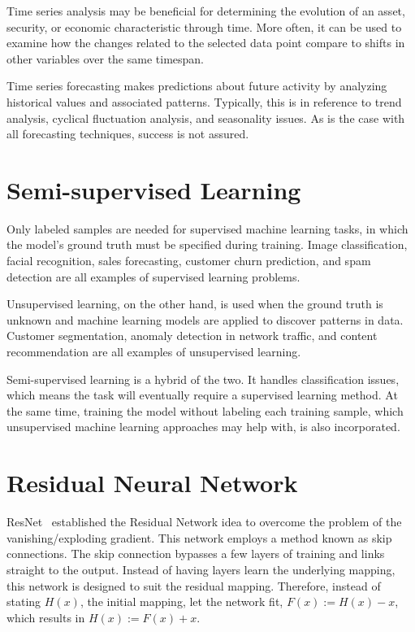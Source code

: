 Time series analysis may be beneficial for determining the evolution of an asset, security, or economic characteristic through time. More often, it can be used to examine how the changes related to the selected data point compare to shifts in other variables over the same timespan. 

Time series forecasting makes predictions about future activity by analyzing historical values and associated patterns. Typically, this is in reference to trend analysis, cyclical fluctuation analysis, and seasonality issues. As is the case with all forecasting techniques, success is not assured. 


\section{Semi-supervised Learning}

Only labeled samples are needed for supervised machine learning tasks, in which the model's ground truth must be specified during training.
Image classification, facial recognition, sales forecasting, customer churn prediction, and spam detection are all examples of supervised learning problems. 

Unsupervised learning, on the other hand, is used when the ground truth is unknown and machine learning models are applied to discover patterns in data. Customer segmentation, anomaly detection in network traffic, and content recommendation are all examples of unsupervised learning. 

Semi-supervised learning is a hybrid of the two. It handles classification issues, which means the task will eventually require a supervised learning method. At the same time, training the model without labeling each training sample, which unsupervised machine learning approaches may help with, is also incorporated. 

\section{Residual Neural Network}
ResNet~\cite{he2016deep} established the Residual Network idea to overcome the problem of the vanishing/exploding gradient.
This network employs a method known as skip connections.
The skip connection bypasses a few layers of training and links straight to the output. 
Instead of having layers learn the underlying mapping, this network is designed to suit the residual mapping.
Therefore, instead of stating $H(x)$, the initial mapping, let the network fit, $F(x):= H(x) - x$, which results in $H(x):= F(x) + x$. 

